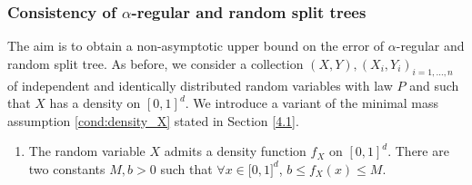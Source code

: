 \documentclass[paper=a4, fontsize=11pt]{scrartcl}
\begin{document}





\subsubsection{Consistency of $\alpha$-regular and random split trees}\label{sec_wager}

The aim is to obtain a non-asymptotic upper bound on the error of $\alpha$-regular and random split tree.
As before, we consider a collection $(X,Y), (X_i,Y_i)_{i=1,\dots,n}$ of independent and identically distributed random variables with law $P$ and such that $X$ has a density on $ [0,1]^d$. We introduce a variant of the minimal mass assumption \ref{cond:density_X} stated in Section \ref{4.1}. %

\begin{enumerate}[label=(XTREE), wide=0.5em,  leftmargin=*]
\item  \label{cond:density_XCART} The random variable $X$ admits a density function $f_X$ on $[0,1]^d$. There are two constants $M, b > 0$ such that $\forall x \in \mathcal [0,1]^d$,  $b \leq f_X(x) \leq M$.
\end{enumerate}
\end{document}
